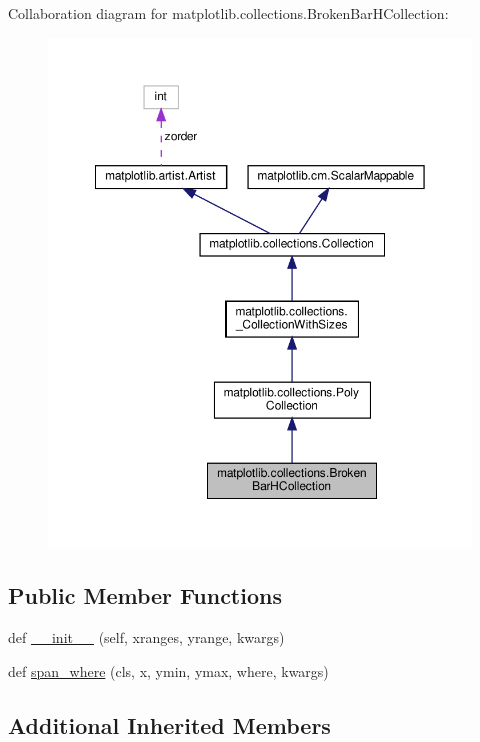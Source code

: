 Collaboration diagram for matplotlib.\+collections.\+Broken\+Bar\+H\+Collection\+:
\nopagebreak
\begin{figure}[H]
\begin{center}
\leavevmode
\includegraphics[width=350pt]{classmatplotlib_1_1collections_1_1BrokenBarHCollection__coll__graph}
\end{center}
\end{figure}
\subsection*{Public Member Functions}
\begin{DoxyCompactItemize}
\item 
def \hyperlink{classmatplotlib_1_1collections_1_1BrokenBarHCollection_aa16b39a70084a828f3fe050d6ee1b036}{\+\_\+\+\_\+init\+\_\+\+\_\+} (self, xranges, yrange, kwargs)
\item 
def \hyperlink{classmatplotlib_1_1collections_1_1BrokenBarHCollection_a92fcd6cdf07fed876f84698f93c2d7ac}{span\+\_\+where} (cls, x, ymin, ymax, where, kwargs)
\end{DoxyCompactItemize}
\subsection*{Additional Inherited Members}


